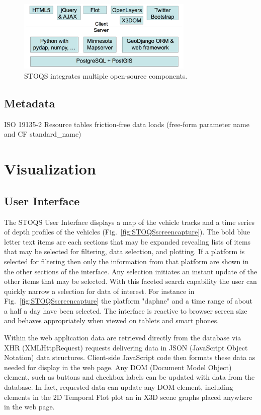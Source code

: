 \documentclass[conference]{IEEEtran}
\begin{document}
\begin{figure}[htbp]
\centering
\includegraphics[width=3.3in]{stoqs_arch_simple.png}
\caption{STOQS integrates multiple open-source components.}
\label{fig:STOQSArch}
\end{figure}

\subsection{Metadata}

ISO 19135-2
Resource tables
friction-free data loads (free-form parameter name and CF standard\_name)


\section{Visualization}

\subsection{User Interface}

The STOQS User Interface displays a map of the vehicle tracks and a time series of depth profiles of the vehicles (Fig.~\ref{fig:STOQSscreencapture}). The bold blue letter text items are each sections that may be expanded revealing lists of items that may be selected for filtering, data selection, and plotting. If a platform is selected for filtering then only the information from that platform are shown in the other sections of the interface. Any selection initiates an instant update of the other items that may be selected. With this faceted search capability the user can quickly narrow a selection for data of interest. For instance in Fig.~\ref{fig:STOQSscreencapture} the platform "daphne"  and a time range of about a half a day have been selected. The interface is reactive to browser screen size and behaves appropriately when viewed on tablets and smart phones.

Within the web application data are retrieved directly from the database via XHR (XMLHttpRequest) requests delivering data in JSON (JavaScript Object Notation) data structures. Client-side JavaScript code then formats these data as needed for display in the web page. Any DOM (Document Model Object) element, such as buttons and checkbox labels can be updated with data from the database. In fact, requested data can update any DOM element, including elements in the 2D Temporal Flot plot an in  X3D scene graphs placed anywhere in the web page.
\end{document}
